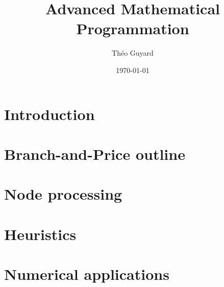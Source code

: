\documentclass{article}
\title{Advanced Mathematical Programmation}
\author{Théo Guyard}
\date{\today}
\begin{document}


\tableofcontents
\newpage

\section{Introduction}



\newpage

\section{Branch-and-Price outline}

\newpage

\section{Node processing}



\newpage

\section{Heuristics}


\newpage

\section{Numerical applications}


\newpage

\printbibliography
\end{document}
